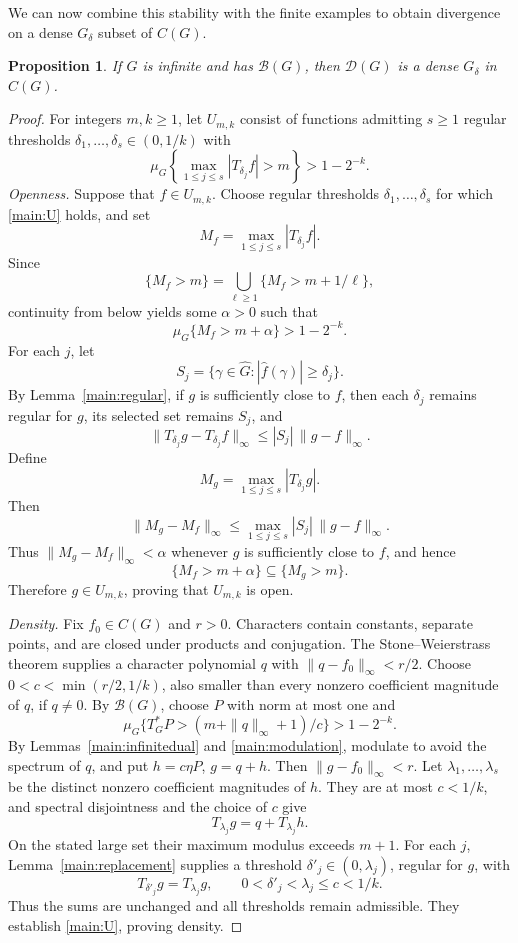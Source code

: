 \documentclass[11pt]{amsart}
\newtheorem{proposition}[theorem]{Proposition}
\theoremstyle{definition}
\theoremstyle{remark}
\newcommand{\B}{\mathcal B}
\newcommand{\D}{\mathcal D}
\begin{document}
We can now combine this stability with the finite examples to obtain
divergence on a dense \(G_\delta\) subset of \(C(G)\).

\begin{proposition}\label{main:category}
If \(G\) is infinite and has \(\B(G)\), then \(\D(G)\)
is a dense \(G_\delta\) in \(C(G)\).
\end{proposition}

\begin{proof}
For integers \(m,k\geq1\), let \(U_{m,k}\) consist of functions
admitting \(s\geq1\) regular thresholds
\(\delta_1,\ldots,\delta_s\in(0,1/k)\) with
\begin{equation}\label{main:U}
 \mu_G\left\{\max_{1\leq j\leq s}|T_{\delta_j}f|>m\right\}>1-2^{-k}.
\end{equation}
\emph{Openness.}
Suppose that \(f\in U_{m,k}\). Choose regular thresholds
\(\delta_1,\ldots,\delta_s\) for which \eqref{main:U} holds, and set
\[
 M_f=\max_{1\leq j\leq s}|T_{\delta_j}f|.
\]
Since
\[
 \{M_f>m\}=\bigcup_{\ell\geq1}\{M_f>m+1/\ell\},
\]
continuity from below yields some \(\alpha>0\) such that
\[
 \mu_G\{M_f>m+\alpha\}>1-2^{-k}.
\]
For each \(j\), let
\[
 S_j=\{\gamma\in\widehat G:
             |\widehat f(\gamma)|\geq\delta_j\}.
\]
By Lemma~\ref{main:regular}, if \(g\) is sufficiently close to \(f\),
then each \(\delta_j\) remains regular for \(g\), its selected set
remains \(S_j\), and
\[
 \|T_{\delta_j}g-T_{\delta_j}f\|_\infty
 \leq |S_j|\,\|g-f\|_\infty.
\]
Define
\[
 M_g=\max_{1\leq j\leq s}|T_{\delta_j}g|.
\]
Then
\[
 \|M_g-M_f\|_\infty
 \leq \max_{1\leq j\leq s}|S_j|\,\|g-f\|_\infty.
\]
Thus \(\|M_g-M_f\|_\infty<\alpha\) whenever \(g\) is sufficiently
close to \(f\), and hence
\[
 \{M_f>m+\alpha\}\subseteq\{M_g>m\}.
\]
Therefore \(g\in U_{m,k}\), proving that \(U_{m,k}\) is open.

\emph{Density.}
Fix \(f_0\in C(G)\) and \(r>0\).
Characters contain constants, separate points, and are closed
under products and conjugation. The Stone--Weierstrass theorem
\cite[Theorem~1.2.4(a)]{Rudin} supplies a character polynomial \(q\)
with \(\|q-f_0\|_\infty<r/2\).
Choose \(0<c<\min(r/2,1/k)\), also smaller than every nonzero
coefficient magnitude of \(q\), if \(q\ne0\).
By \(\B(G)\), choose \(P\) with norm at most one and
\[
 \mu_G\{T^*_GP>(m+\|q\|_\infty+1)/c\}>1-2^{-k}.
\]
By Lemmas~\ref{main:infinitedual} and \ref{main:modulation},
modulate to avoid the spectrum of \(q\), and put
\(h=c\eta P\), \(g=q+h\). Then \(\|g-f_0\|_\infty<r\).
Let \(\lambda_1,\ldots,\lambda_s\) be the distinct nonzero
coefficient magnitudes of \(h\). They are at most \(c<1/k\),
and spectral disjointness and the choice of \(c\) give
\[
 T_{\lambda_j}g=q+T_{\lambda_j}h.
\]
On the stated large set their maximum modulus exceeds \(m+1\).
For each \(j\), Lemma~\ref{main:replacement} supplies a threshold
\(\delta'_j\in(0,\lambda_j)\), regular for \(g\), with
\[
 T_{\delta'_j}g=T_{\lambda_j}g,\qquad
 0<\delta'_j<\lambda_j\leq c<1/k.
\]
Thus the sums are unchanged and all thresholds remain admissible.
They establish \eqref{main:U}, proving density.


\end{proof}
\end{document}
